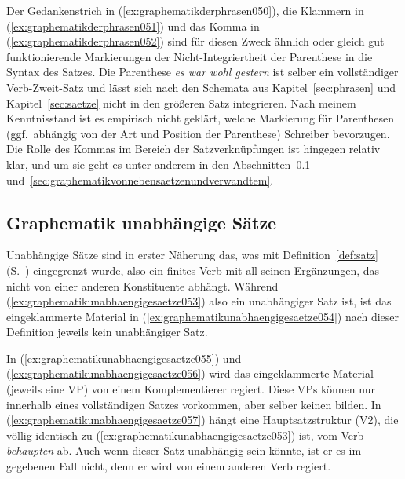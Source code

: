 Der Gedankenstrich in (\ref{ex:graphematikderphrasen050}), die Klammern in (\ref{ex:graphematikderphrasen051}) und das Komma in (\ref{ex:graphematikderphrasen052}) sind für diesen Zweck ähnlich oder gleich gut funktionierende Markierungen der Nicht-Integriertheit der Parenthese in die Syntax des Satzes.
Die Parenthese \textit{es war wohl gestern} ist selber ein vollständiger Verb-Zweit-Satz und lässt sich nach den Schemata aus Kapitel~\ref{sec:phrasen} und Kapitel~\ref{sec:saetze} nicht in den größeren Satz integrieren.
Nach meinem Kenntnisstand ist es empirisch nicht geklärt, welche Markierung für Parenthesen (ggf.\ abhängig von der Art und Position der Parenthese) Schreiber bevorzugen.
Die Rolle des Kommas im Bereich der Satzverknüpfungen ist hingegen relativ klar, und um sie geht es unter anderem in den Abschnitten~\ref{sec:graphematikunabhaengigesaetze} und~\ref{sec:graphematikvonnebensaetzenundverwandtem}.

\subsection{Graphematik unabhängige Sätze}
\label{sec:graphematikunabhaengigesaetze}

Unabhängige Sätze sind in erster Näherung das, was mit Definition~\ref{def:satz} (S.~\pageref{def:satz}) eingegrenzt wurde, also ein finites Verb mit all seinen Ergänzungen, das nicht von einer anderen Konstituente abhängt.
Während (\ref{ex:graphematikunabhaengigesaetze053}) also ein unabhängiger Satz ist, ist das eingeklammerte Material in (\ref{ex:graphematikunabhaengigesaetze054}) nach dieser Definition jeweils kein unabhängiger Satz.

\begin{exe}
  \ex\label{ex:graphematikunabhaengigesaetze054}
  \begin{xlist}
  \end{xlist}
\end{exe}

In (\ref{ex:graphematikunabhaengigesaetze055}) und (\ref{ex:graphematikunabhaengigesaetze056}) wird das eingeklammerte Material (jeweils eine VP) von einem Komplementierer regiert.
Diese VPs können nur innerhalb eines vollständigen Satzes vorkommen, aber selber keinen bilden.
In (\ref{ex:graphematikunabhaengigesaetze057}) hängt eine Hauptsatzstruktur (V2), die völlig identisch zu (\ref{ex:graphematikunabhaengigesaetze053}) ist, vom Verb \textit{behaupten} ab.
Auch wenn dieser Satz unabhängig sein könnte, ist er es im gegebenen Fall nicht, denn er wird von einem anderen Verb regiert.

